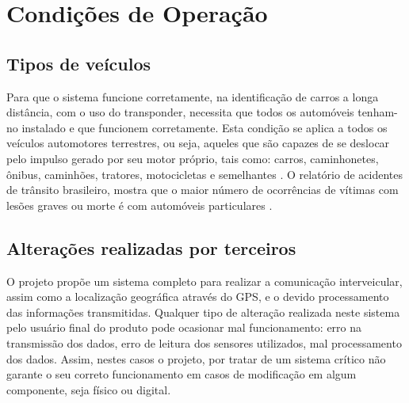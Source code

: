 \chapter[Condições de Operação]{Condições de Operação}

\section{Tipos de veículos}
Para que o sistema funcione corretamente, na identificação de carros a longa distância, com o uso do transponder, necessita que todos os automóveis tenham-no instalado e que funcionem corretamente. Esta condição se aplica a todos os veículos automotores terrestres, ou seja, aqueles que são capazes de se deslocar pelo impulso gerado por seu motor próprio, tais como: carros, caminhonetes, ônibus, caminhões, tratores, motocicletas e semelhantes \cite{egov}. O relatório de acidentes de trânsito brasileiro, mostra que o maior número de ocorrências de vítimas com lesões graves ou morte é com automóveis particulares \cite{ipea2}.


\section{Alterações realizadas por terceiros}
O projeto propõe um sistema completo para realizar a comunicação interveicular, assim como a localização geográfica através do GPS, e o devido processamento das informações transmitidas. Qualquer tipo de alteração realizada neste sistema pelo usuário final do produto pode ocasionar mal funcionamento: erro na transmissão dos dados, erro de leitura dos sensores utilizados, mal processamento dos dados. Assim, nestes casos o projeto, por tratar de um sistema crítico não garante o seu correto funcionamento em casos de modificação em algum componente, seja físico ou digital.

